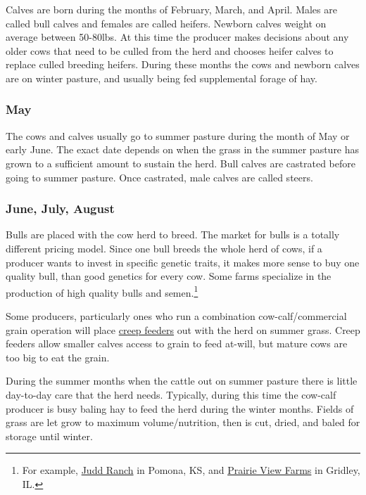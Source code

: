 \documentclass[
  letterpaper,
  DIV=11,
  numbers=noendperiod]{scrreprt}
\begin{document}
Calves are born during the months of February, March, and April. Males
are called bull calves and females are called heifers. Newborn calves
weight on average between 50-80lbs. At this time the producer makes
decisions about any older cows that need to be culled from the herd and
chooses heifer calves to replace culled breeding heifers. During these
months the cows and newborn calves are on winter pasture, and usually
being fed supplemental forage of hay.

\hypertarget{may}{%
\subsubsection{May}\label{may}}

The cows and calves usually go to summer pasture during the month of May
or early June. The exact date depends on when the grass in the summer
pasture has grown to a sufficient amount to sustain the herd. Bull
calves are castrated before going to summer pasture. Once castrated,
male calves are called steers.

\hypertarget{june-july-august}{%
\subsubsection{June, July, August}\label{june-july-august}}

Bulls are placed with the cow herd to breed. The market for bulls is a
totally different pricing model. Since one bull breeds the whole herd of
cows, if a producer wants to invest in specific genetic traits, it makes
more sense to buy one quality bull, than good genetics for every cow.
Some farms specialize in the production of high quality bulls and
semen.\footnote{For example, \href{http://www.juddranch.com/}{Judd
  Ranch} in Pomona, KS, and \href{http://www.pvfangus.com/}{Prairie View
  Farms} in Gridley, IL.}

Some producers, particularly ones who run a combination
cow-calf/commercial grain operation will place
\href{https://www.google.com/search?q=creep+feeder\&espv=2\&biw=1920\&bih=1075\&source=lnms\&tbm=isch\&sa=X\&ved=0CAcQ_AUoAmoVChMI18ne2paTyQIVSJUeCh3eMw5X}{creep
feeders} out with the herd on summer grass. Creep feeders allow smaller
calves access to grain to feed at-will, but mature cows are too big to
eat the grain.

During the summer months when the cattle out on summer pasture there is
little day-to-day care that the herd needs. Typically, during this time
the cow-calf producer is busy baling hay to feed the herd during the
winter months. Fields of grass are let grow to maximum volume/nutrition,
then is cut, dried, and baled for storage until winter.
\end{document}
